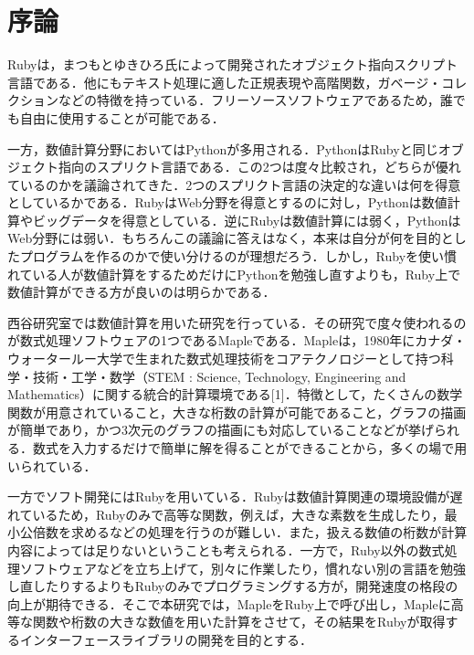 \section{序論}
Rubyは，まつもとゆきひろ氏によって開発されたオブジェクト指向スクリプト言語である．他にもテキスト処理に適した正規表現や高階関数，ガベージ・コレクションなどの特徴を持っている．フリーソースソフトウェアであるため，誰でも自由に使用することが可能である．

一方，数値計算分野においてはPythonが多用される．PythonはRubyと同じオブジェクト指向のスプリクト言語である．この2つは度々比較され，どちらが優れているのかを議論されてきた．2つのスプリクト言語の決定的な違いは何を得意としているかである．RubyはWeb分野を得意とするのに対し，Pythonは数値計算やビッグデータを得意としている．逆にRubyは数値計算には弱く，PythonはWeb分野には弱い．もちろんこの議論に答えはなく，本来は自分が何を目的としたプログラムを作るのかで使い分けるのが理想だろう．しかし，Rubyを使い慣れている人が数値計算をするためだけにPythonを勉強し直すよりも，Ruby上で数値計算ができる方が良いのは明らかである．

西谷研究室では数値計算を用いた研究を行っている．その研究で度々使われるのが数式処理ソフトウェアの1つであるMapleである．Mapleは，1980年にカナダ・ウォータールー大学で生まれた数式処理技術をコアテクノロジーとして持つ科学・技術・工学・数学（STEM : Science, Technology, Engineering and Mathematics）に関する統合的計算環境である[1]．特徴として，たくさんの数学関数が用意されていること，大きな桁数の計算が可能であること，グラフの描画が簡単であり，かつ3次元のグラフの描画にも対応していることなどが挙げられる．数式を入力するだけで簡単に解を得ることができることから，多くの場で用いられている．

一方でソフト開発にはRubyを用いている．Rubyは数値計算関連の環境設備が遅れているため，Rubyのみで高等な関数，例えば，大きな素数を生成したり，最小公倍数を求めるなどの処理を行うのが難しい．また，扱える数値の桁数が計算内容によっては足りないということも考えられる．一方で，Ruby以外の数式処理ソフトウェアなどを立ち上げて，別々に作業したり，慣れない別の言語を勉強し直したりするよりもRubyのみでプログラミングする方が，開発速度の格段の向上が期待できる．そこで本研究では，MapleをRuby上で呼び出し，Mapleに高等な関数や桁数の大きな数値を用いた計算をさせて，その結果をRubyが取得するインターフェースライブラリの開発を目的とする．

